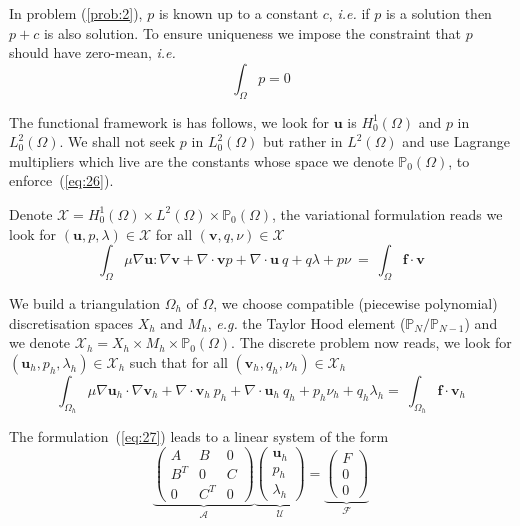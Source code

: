 \documentclass[a4paper]{book}
\begin{document}
In problem (\ref{prob:2}), $p$ is known up to a constant $c$,
\emph{i.e.} if $p$ is a solution then $p+c$ is also solution. To
ensure uniqueness we impose the constraint that $p$ should have
zero-mean, \emph{i.e.}
\begin{equation}
  \label{eq:26}
  \int_\Omega p = 0
\end{equation}

The functional framework is has follows, we look for $\mathbf{u}$ is
$H^1_0(\Omega)$ and $p$ in $L^2_0(\Omega)$. We shall not seek $p$ in
$L^2_0(\Omega)$ but rather in $L^2(\Omega)$ and use Lagrange
multipliers which live are the constants whose space we denote
$\mathbb{P}_0(\Omega)$, to enforce~(\ref{eq:26}).

Denote $\mathcal{X} = H^1_0(\Omega)\times
L^2(\Omega)\times\mathbb{P}_0(\Omega)$, the variational formulation
reads we look for $(\mathbf{u}, p, \lambda) \in \mathcal{X}$ for all
$(\mathbf{v},q,\nu) \in \mathcal{X}$
\begin{equation}
  \label{eq:25}
  \int_\Omega \mu \nabla \mathbf{u} : \nabla \mathbf{v} + \nabla \cdot \mathbf{v} p + \nabla \cdot \mathbf{u}\ q + q \lambda + p \nu  \ = \ \int_\Omega \mathbf{f} \cdot \mathbf{v}
\end{equation}

We build a triangulation $\Omega_h$ of $\Omega$, we choose compatible
(piecewise polynomial) discretisation spaces $X_h$ and $M_h$,
\emph{e.g.} the Taylor Hood element ($\mathbb{P}_N/\mathbb{P}_{N-1}$)
and we denote $\mathcal{X}_h=X_h\times M_h \times
\mathbb{P}_0(\Omega)$.  The discrete problem now reads, we look for
$(\mathbf{u}_h,p_h,\lambda_h) \in \mathcal{X}_h$ such that for all
$(\mathbf{v}_h,q_h,\nu_h) \in \mathcal{X}_h$
\begin{equation}
  \label{eq:27}
  \int_{\Omega_h} \mu \nabla \mathbf{u}_h \cdot \nabla \mathbf{v}_h + \nabla \cdot \mathbf{v}_h \ p_h + \nabla \cdot \mathbf{u}_h\ q_h + p_h \nu_h + q_h \lambda_h   = \ \int_{\Omega_h} \mathbf{f} \cdot \mathbf{v}_h
\end{equation}

The formulation~(\ref{eq:27}) leads to a linear system of the form
\begin{equation}
  \label{eq:28}
  \underbrace{\begin{pmatrix}
    A & B & 0\\
    B^T & 0 & C\\
    0 & C^T & 0
  \end{pmatrix}}_{\mathcal{A}}
\underbrace{
  \begin{pmatrix}
    \mathbf{u}_h\\
    p_h\\
    \lambda_h
  \end{pmatrix}}_{\mathcal{U}} =
\underbrace{\begin{pmatrix}
    F\\
    0\\
    0
  \end{pmatrix}}_{\mathcal{F}}
\end{equation}
\end{document}
